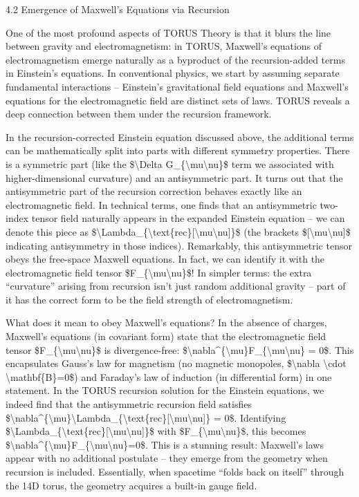 \documentclass[]{article}
\begin{document}
4.2 Emergence of Maxwell's Equations via Recursion

One of the most profound aspects of TORUS Theory is that it blurs the
line between gravity and electromagnetism: in TORUS, Maxwell's equations
of electromagnetism emerge naturally as a byproduct of the
recursion-added terms in Einstein's equations. In conventional physics,
we start by assuming separate fundamental interactions -- Einstein's
gravitational field equations and Maxwell's equations for the
electromagnetic field are distinct sets of laws. TORUS reveals a deep
connection between them under the recursion framework.

In the recursion-corrected Einstein equation discussed above, the
additional terms can be mathematically split into parts with different
symmetry properties. There is a symmetric part (like the
\$\textbackslash{}Delta G\_\{\textbackslash{}mu\textbackslash{}nu\}\$
term we associated with higher-dimensional curvature) and an
antisymmetric part. It turns out that the antisymmetric part of the
recursion correction behaves exactly like an electromagnetic field. In
technical terms, one finds that an antisymmetric two-index tensor field
naturally appears in the expanded Einstein equation -- we can denote
this piece as
\$\textbackslash{}Lambda\_\{\textbackslash{}text\{rec\}{[}\textbackslash{}mu\textbackslash{}nu{]}\}\$
(the brackets \${[}\textbackslash{}mu\textbackslash{}nu{]}\$ indicating
antisymmetry in those indices). Remarkably, this antisymmetric tensor
obeys the free-space Maxwell equations. In fact, we can identify it with
the electromagnetic field tensor
\$F\_\{\textbackslash{}mu\textbackslash{}nu\}\$! In simpler terms: the
extra ``curvature'' arising from recursion isn't just random additional
gravity -- part of it has the correct form to be the field strength of
electromagnetism.

What does it mean to obey Maxwell's equations? In the absence of
charges, Maxwell's equations (in covariant form) state that the
electromagnetic field tensor
\$F\_\{\textbackslash{}mu\textbackslash{}nu\}\$ is divergence-free:
\$\textbackslash{}nabla\^{}\{\textbackslash{}mu\}F\_\{\textbackslash{}mu\textbackslash{}nu\}
= 0\$. This encapsulates Gauss's law for magnetism (no magnetic
monopoles, \$\textbackslash{}nabla \textbackslash{}cdot
\textbackslash{}mathbf\{B\}=0\$) and Faraday's law of induction (in
differential form) in one statement. In the TORUS recursion solution for
the Einstein equations, we indeed find that the antisymmetric recursion
field satisfies
\$\textbackslash{}nabla\^{}\{\textbackslash{}mu\}\textbackslash{}Lambda\_\{\textbackslash{}text\{rec\}{[}\textbackslash{}mu\textbackslash{}nu{]}\}
= 0\$. Identifying
\$\textbackslash{}Lambda\_\{\textbackslash{}text\{rec\}{[}\textbackslash{}mu\textbackslash{}nu{]}\}\$
with \$F\_\{\textbackslash{}mu\textbackslash{}nu\}\$, this becomes
\$\textbackslash{}nabla\^{}\{\textbackslash{}mu\}F\_\{\textbackslash{}mu\textbackslash{}nu\}=0\$.
This is a stunning result: Maxwell's laws appear with no additional
postulate -- they emerge from the geometry when recursion is included.
Essentially, when spacetime ``folds back on itself'' through the 14D
torus, the geometry acquires a built-in gauge field.
\end{document}
